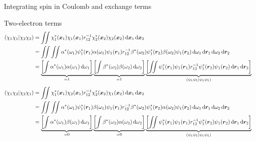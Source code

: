 \documentclass[aspectratio=169,9pt]{beamer}
\newcommand{\br}{\boldsymbol{r}}
\newcommand{\bx}{\boldsymbol{x}}
\newcommand{\rbraket}[2]{( #1 | #2 )}
\begin{document}
\begin{frame}{Integrating spin in Coulomb and exchange terms}
	\begin{block}{Two-electron terms}
	\small
		\begin{equation*}
		\begin{split}
			\rbraket{\chi_1 \chi_1}{\chi_2 \chi_2}
			& = \iint \chi_1^*(\bx_1) \chi_1(\bx_1) r_{12}^{-1} \chi_2^*(\bx_2) \chi_2(\bx_2) \dd{\bx_1} \dd{\bx_2} 
			\\
			& = \iint \iint \alpha^*(\omega_1) \psi_1^*(\br_1) \alpha(\omega_1) \psi_1(\br_1) r_{12}^{-1} \beta^*(\omega_2) \psi_1^*(\br_2) \beta(\omega_2) \psi_1(\br_2) \dd{\omega_1} \dd{\br_1} \dd{\omega_2} \dd{\br_2} 
			\\
			& = \underbrace{\qty[ \int \alpha^*(\omega_1) \alpha(\omega_1) \dd{\omega_1} ]}_{=1} 
			\underbrace{\qty[ \int \beta^*(\omega_2) \beta(\omega_2) \dd{\omega_2} ]}_{=1} 
			\underbrace{\qty[ \iint \psi_1^*(\br_1) \psi_1(\br_1) r_{12}^{-1} \psi_1^*(\br_2) \psi_1(\br_2) \dd{\br_1} \dd{\br_2} ]}_{\rbraket{\psi_1 \psi_1}{\psi_1 \psi_1}}
		\end{split}
		\end{equation*}
		\begin{equation*}
		\begin{split}
			\rbraket{\chi_1 \chi_2}{\chi_2 \chi_1}
			& = \iint \chi_1^*(\bx_1) \chi_2(\bx_1) r_{12}^{-1} \chi_2^*(\bx_2) \chi_1(\bx_2) \dd{\bx_1} \dd{\bx_2} 
			\\
			& = \iint \iint \alpha^*(\omega_1) \psi_1^*(\br_1) \beta(\omega_1) \psi_1(\br_1) r_{12}^{-1} \beta^*(\omega_2) \psi_1^*(\br_2) \alpha(\omega_2) \psi_1(\br_2) \dd{\omega_1} \dd{\br_1} \dd{\omega_2} \dd{\br_2} 
			\\
			& = \underbrace{\qty[ \int \alpha^*(\omega_1) \beta(\omega_1) \dd{\omega_1} ]}_{=0} 
			\underbrace{\qty[ \int \beta^*(\omega_2) \alpha(\omega_2) \dd{\omega_2} ]}_{=0} 
			\underbrace{\qty[ \iint \psi_1^*(\br_1) \psi_1(\br_1) r_{12}^{-1} \psi_1^*(\br_2) \psi_1(\br_2) \dd{\br_1} \dd{\br_2} ]}_{\rbraket{\psi_1 \psi_1}{\psi_1 \psi_1}}
		\end{split}
		\end{equation*}
	\end{block}
\end{frame}
\end{document}
